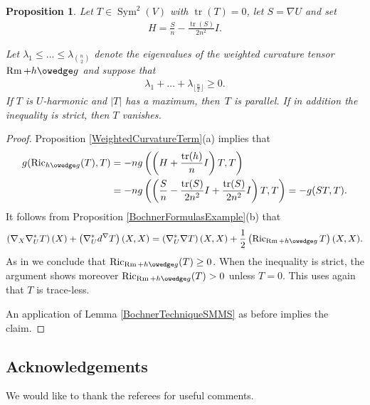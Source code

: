 \documentclass[pdftex]{sigma}
\numberwithin{equation}{section}
\newtheorem{Proposition}[Theorem]{Proposition}
{ \theoremstyle{definition}
\newtheorem{Remark}[Theorem]{Remark} }
\newcommand{\Ric} {\operatorname{Ric}}
\newcommand{ \tr } {\operatorname{tr}}
\newcommand{\Rm} {\operatorname{Rm}}
\newcommand{ \Sym } {\operatorname{Sym}}
\newcommand{ \floor }[1]{ \lfloor #1 \rfloor }
\begin{document}
\begin{Proposition}Let $T \in \Sym^2(V)$ with $\tr(T)=0$, let $S= \nabla U$ and set
\begin{gather*}
H=\frac{S}{n} - \frac{\tr(S)}{2n^2} I.
\end{gather*}

Let $\lambda_1 \leq \dots \leq \lambda_{\genfrac(){0pt}{2}{n}{2}}$ denote the eigenvalues of the weighted curvature tensor $\Rm + h \owedge g$ and suppose that
\begin{gather*}
\lambda_{1} + \dots + \lambda_{\floor{\frac{n}{2}}} \geq 0.
\end{gather*}
If $T$ is $U$-harmonic and $|T|$ has a maximum, then~$T$ is parallel. If in addition the inequality is strict, then $T$ vanishes.
\end{Proposition}
\begin{proof}Proposition \ref{WeightedCurvatureTerm}(a) implies that
\begin{align*}
g  ( \Ric_{h \owedge g}(T), T ) & = - n g \left( \left(H + \frac{\tr(h)}{n} I \right)T ,T \right) \\
&  = - n g \left( \left( \frac{S}{n} - \frac{\tr(S)}{2n^2} I + \frac{\tr(S)}{2n^2} I \right) T, T \right)
  = - g( ST,T ).
\end{align*}
It follows from Proposition \ref{BochnerFormulasExample}(b) that
\begin{gather*}
\left( \nabla_X \nabla^{*}_U T \right)(X) + \left( \nabla^{*}_U d^{\nabla} T \right) (X,X) = \left( \nabla^{*}_U \nabla T \right)(X,X)+ \frac{1}{2} \left( \Ric_{\Rm+h \owedge g} T \right) (X,X).
\end{gather*}
As in \cite[Lemma 2.1 and Proposition~2.9]{PetersenWinkBochner} we conclude that $\Ric_{\Rm + h \owedge g}(T) \geq 0$. When the inequality is strict, the argument shows moreover $\Ric_{\Rm + h \owedge g}(T) > 0$ unless $T = 0$. This uses again that $T$ is trace-less.

An application of Lemma \ref{BochnerTechniqueSMMS} as before implies the claim.
\end{proof}

\subsection*{Acknowledgements}

We would like to thank the referees for useful comments.
\end{document}
